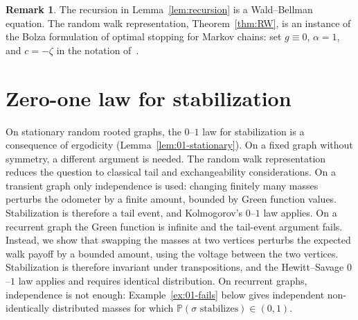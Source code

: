 \documentclass[11pt]{amsart}
\theoremstyle{plain}
\theoremstyle{definition}
\newtheorem{remark}[theorem]{Remark}
\renewcommand{\P}{\mathbb{P}}
\begin{document}
	\begin{remark}\label{rem:bolza}
		The recursion in Lemma~\ref{lem:recursion} is a Wald--Bellman equation. The random walk representation, Theorem~\ref{thm:RW}, is an instance of the Bolza formulation of optimal stopping for Markov chains: set $g\equiv 0$, $\alpha=1$, and $c=-\zeta$ in the notation of~\citep[Section~1.2, eqs.~(1.2.65) and~(1.2.73)]{PS06}.
	\end{remark}
	
	\section{Zero-one law for stabilization}\label{sec:01-law}
	On stationary random rooted graphs, the $0$--$1$ law for stabilization is a consequence of ergodicity (Lemma~\ref{lem:01-stationary}). On a fixed graph without symmetry, a different argument is needed. The random walk representation reduces the question to classical tail and exchangeability considerations. On a transient graph only independence is used: changing finitely many masses perturbs the odometer by a finite amount, bounded by Green function values. Stabilization is therefore a tail event, and Kolmogorov's $0$--$1$ law applies.  On a recurrent graph the Green function is infinite and the tail-event argument fails. Instead, we show that swapping the masses at two vertices perturbs the expected walk payoff by a bounded amount, using the voltage between the two vertices. Stabilization is therefore invariant under transpositions, and the Hewitt--Savage $0$--$1$ law applies and requires identical distribution. On recurrent graphs, independence is not enough: Example~\ref{ex:01-fails} below gives independent non-identically distributed masses for which $\P(\sigma\text{ stabilizes})\in(0,1)$.
	
\end{document}
